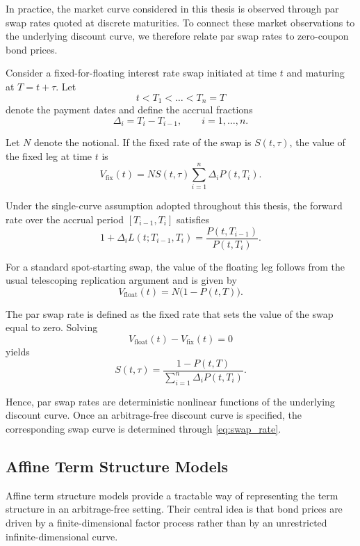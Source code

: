 In practice, the market curve considered in this thesis is observed through par swap rates quoted at discrete maturities. To connect these market observations to the underlying discount curve, we therefore relate par swap rates to zero-coupon bond prices.

Consider a fixed-for-floating interest rate swap initiated at time $t$ and maturing at $T=t+\tau$. Let
\[
t<T_1<\dots<T_n=T
\]
denote the payment dates and define the accrual fractions
\[
\Delta_i = T_i-T_{i-1}, \qquad i=1,\dots,n.
\]

Let $N$ denote the notional. If the fixed rate of the swap is $S(t,\tau)$, the value of the fixed leg at time $t$ is
\begin{equation}
V_{\mathrm{fix}}(t)
=
N S(t,\tau)
\sum_{i=1}^{n}\Delta_i P(t,T_i).
\label{eq:fixed_leg}
\end{equation}

Under the single-curve assumption adopted throughout this thesis, the forward rate over the accrual period $[T_{i-1},T_i]$ satisfies
\[
1+\Delta_i L(t;T_{i-1},T_i)
=
\frac{P(t,T_{i-1})}{P(t,T_i)}.
\]

For a standard spot-starting swap, the value of the floating leg follows from the usual telescoping replication argument and is given by
\begin{equation}
V_{\mathrm{float}}(t)
=
N\bigl(1-P(t,T)\bigr).
\label{eq:floating_leg}
\end{equation}

The par swap rate is defined as the fixed rate that sets the value of the swap equal to zero. Solving
\[
V_{\mathrm{float}}(t)-V_{\mathrm{fix}}(t)=0
\]
yields
\begin{equation}
S(t,\tau)
=
\frac{1-P(t,T)}
{\sum_{i=1}^{n} \Delta_i P(t,T_i)}.
\label{eq:swap_rate}
\end{equation}

Hence, par swap rates are deterministic nonlinear functions of the underlying discount curve. Once an arbitrage-free discount curve is specified, the corresponding swap curve is determined through \eqref{eq:swap_rate}.


\subsection{Affine Term Structure Models}
\label{sec:Affine TSM Theory}

Affine term structure models provide a tractable way of representing the term structure in an arbitrage-free setting. Their central idea is that bond prices are driven by a finite-dimensional factor process rather than by an unrestricted infinite-dimensional curve.

